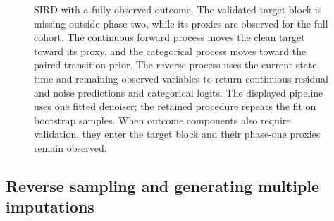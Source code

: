 \begin{figure}
{%
}
\caption{SIRD with a fully observed outcome. The validated target block is missing outside phase two, while its proxies are observed for the full cohort. The continuous forward process moves the clean target toward its proxy, and the categorical process moves toward the paired transition prior. The reverse process uses the current state, time and remaining observed variables to return continuous residual and noise predictions and categorical logits. The displayed pipeline uses one fitted denoiser; the retained procedure repeats the fit on bootstrap samples. When outcome components also require validation, they enter the target block and their phase-one proxies remain observed.}
\label{fig:sird-architecture}
\end{figure}


\subsection{Reverse sampling and generating multiple imputations}
\label{sec:sird_mi}

